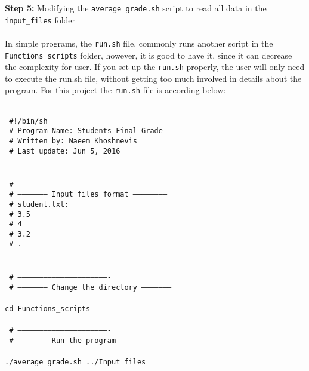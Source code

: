 \textbf{Step 5:} Modifying the  \texttt{average\_grade.sh} script to read all data in the \texttt{input\_files} folder \\
\\
\noindent
In simple programs, the \texttt{run.sh} file, commonly runs another script in the \texttt{Functions\_scripts} folder, however, it is good to have it, since it can decrease the complexity for user. If you set up the \texttt{run.sh} properly, the user will only need to execute the run.sh file, without getting too much involved in details about the program. For this project the \texttt{run.sh} file is according below:\\

 \begin{mdframed}[hidealllines=true,backgroundcolor=gray!20]
 \begin{singlespace}
 \fontsize{10pt}{1pt}
\texttt{
\\
\noindent
{ \color{matlab_green}  \#!/bin/sh}\\
{ \color{matlab_green}  \# Program Name: Students Final Grade}\\
{ \color{matlab_green}  \# Written by: Naeem Khoshnevis}\\
{ \color{matlab_green}  \# Last update: Jun 5, 2016}\\
\\
\\
{ \color{matlab_green} \# ----------------------------------------------------------------} \\
{ \color{matlab_green} \# --------------------- Input files format -----------------------} \\
{ \color{matlab_green} \# student.txt:} \\
{ \color{matlab_green} \# 3.5} \\
{ \color{matlab_green} \# 4} \\
{ \color{matlab_green} \# 3.2} \\
{ \color{matlab_green} \# .} \\
\\
\\
{ \color{matlab_green} \# ----------------------------------------------------------------} \\
{ \color{matlab_green} \# --------------------- Change the directory ---------------------} \\
\\
cd \texttt{Functions\_scripts}\\
\\
{ \color{matlab_green} \# ----------------------------------------------------------------} \\
{ \color{matlab_green} \# --------------------- Run the program --------------------------} \\
\\
./average\_grade.sh ../Input\_files\\
 }
 \end{singlespace}
\end{mdframed}
